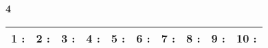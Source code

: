 \documentclass[a4paper, 11pt]{article}
\begin{document}
{\Large\bf 4 } \hspace{1.5cm}
\begin{tabular}{| l|l|l|l|l|l|l|l|l|l| }
\hline
{\large 1 }: \hspace*{0.5cm}
& {\large 2 }: \hspace*{0.5cm}
& {\large 3 }: \hspace*{0.5cm}
& {\large 4 }: \hspace*{0.5cm}
& {\large 5 }: \hspace*{0.5cm}
& {\large 6 }: \hspace*{0.5cm}
& {\large 7 }: \hspace*{0.5cm}
& {\large 8 }: \hspace*{0.5cm}
& {\large 9 }: \hspace*{0.5cm}
& {\large 10 }: \hspace*{0.5cm}
\\ 
 \hline
\end{tabular}
\vspace*{1cm} 
\end{document}
